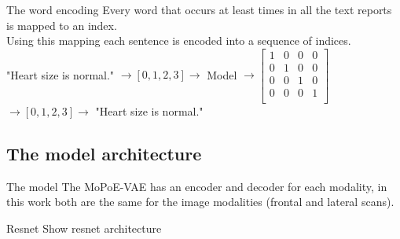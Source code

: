             \begin{frame}{The word encoding}
                Every word that occurs at least  times in all the text reports is mapped to an index.\\
                Using this mapping each sentence is encoded into a sequence of indices.\\
                
                \pause
                "Heart size is normal." $\rightarrow [0,1,2,3] \rightarrow$ Model $\rightarrow
                \begin{bmatrix}
                1 & 0 & 0 & 0\\
                0 & 1 & 0 & 0\\
                0 & 0 & 1 & 0\\
                0 & 0 & 0 & 1\\
                \end{bmatrix}$\\
                $\rightarrow [0,1,2,3] \rightarrow$ "Heart size is normal." 
            \end{frame}
            
        \subsection{The model architecture}
        \begin{frame}{The model}
            The MoPoE-VAE has an encoder and decoder for each modality, in this work both are the same for the image modalities (frontal and lateral scans).
        \end{frame}
        
        \begin{frame}{Resnet}
        Show resnet architecture
            
        \end{frame}
        
